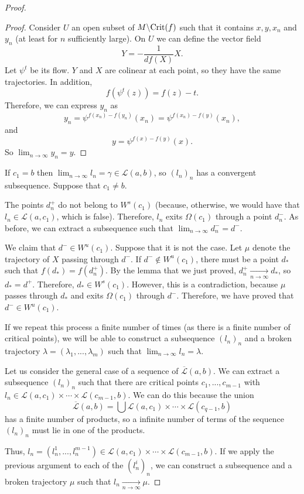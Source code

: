 \begin{proof}
\begin{proof}
Consider $U$ an open subset of $M \backslash \mathrm{Crit}(f)$ such that it contains $x,y, x_n$ and $y_n$ (at least for $n$ sufficiently large). On $U$ we can define the vector field
\[Y = - \frac1{d f(X)} X .\]
Let $\psi^t$ be its flow. $Y$ and $X$ are colinear at each point, so they have the same trajectories. In addition,
\[f(\psi^t(z)) = f(z) - t .\]
Therefore, we can express $y_n$ as
\[y_n = \psi^{f(x_n)-f(y_n)}(x_n) = \psi^{f(x_n)-f(y)}(x_n) ,\]
and
\[y = \psi^{f(x)-f(y)}(x) .\]
So $\displaystyle\lim_{n \rightarrow \infty} y_n = y$.
\end{proof}

If $c_1 = b$ then $\displaystyle\lim_{n \rightarrow \infty} l_n = \gamma \in \mathcal{L}(a,b)$, so $(l_n)_n$ has a convergent subsequence. Suppose that $c_1 \neq b$.

The points $d_n^+$ do not belong to $W^s(c_1)$ (because, otherwise, we would have that $l_n \in \mathcal{L}(a,c_1)$, which is false). Therefore, $l_n$ exits $\Omega(c_1)$ through a point $d_n^-$. As before, we can extract a subsequence such that $\displaystyle\lim_{n \rightarrow \infty} d_n^- = d^-$.

We claim that $d^- \in W^u(c_1)$. Suppose that it is not the case. Let $\mu$ denote the trajectory of $X$ passing through $d^-$. If $d^- \notin W^u(c_1)$, there must be a point $d_{\ast}$ such that $f(d_{\ast}) = f(d_n^+)$. By the lemma that we just proved, $d_n^+ \xrightarrow[n \rightarrow \infty]{} d_{\ast}$, so $d_{\ast} = d^+$. Therefore, $d_{\ast} \in W^s(c_1)$. However, this is a contradiction, because $\mu$ passes through $d_{\ast}$ and exits $\Omega(c_1)$ through $d^-$. Therefore, we have proved that $d^- \in W^u(c_1)$.

If we repeat this process a finite number of times (as there is a finite number of critical points), we will be able to construct a subsequence $(l_n)_n$ and a broken trajectory $\lambda = (\lambda_1,...,\lambda_m)$ such that $\displaystyle\lim_{n \rightarrow \infty} l_n = \lambda$.

Let us consider the general case of a sequence of $\overline{\mathcal{L}}(a,b)$. We can extract a subsequence $(l_n)_n$ such that there are critical points $c_1,...,c_{m-1}$ with $l_n \in \mathcal{L}(a,c_1) \times \cdots \times \mathcal{L}(c_{m-1},b)$. We can do this because the union
\[\overline{\mathcal{L}}(a,b) = \bigcup \mathcal{L}(a,c_1) \times \cdots \times \mathcal{L}(c_{q-1},b)\]
has a finite number of products, so a infinite number of terms of the sequence $(l_n)_n$ must lie in one of the products.

Thus, $l_n = (l_n^1,...,l_n^{m-1}) \in \mathcal{L}(a,c_1) \times \cdots \times \mathcal{L}(c_{m-1},b)$. If we apply the previous argument to each of the $(l_n^i)_n$, we can construct a subsequence and a broken trajectory $\mu$ such that $l_n \xrightarrow[n \rightarrow \infty]{} \mu$.
\end{proof}

